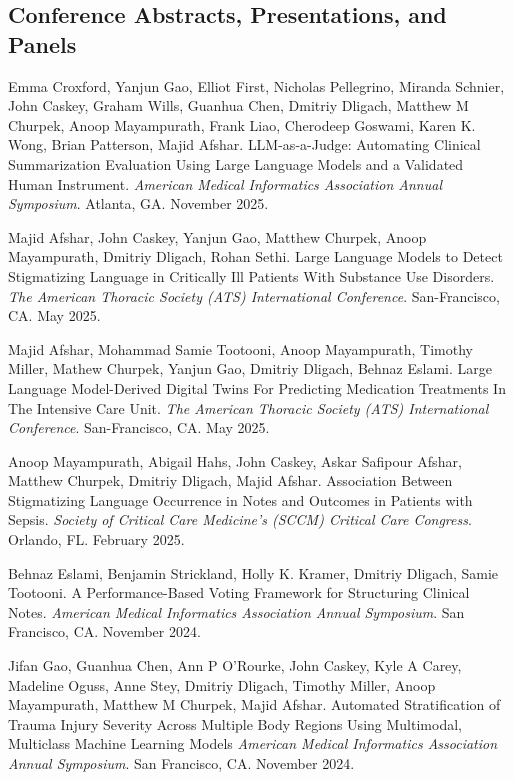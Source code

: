 \documentclass[letterpaper]{article}
\renewenvironment{itemize}{
  \begin{list}{}{
    \setlength{\leftmargin}{1.5em}
  }
}{
  \end{list}
}
\begin{document}
\subsection*{Conference Abstracts, Presentations, and Panels}
\begin{itemize}
\item Emma Croxford, Yanjun Gao, Elliot First, Nicholas Pellegrino, Miranda Schnier, John Caskey, Graham Wills, Guanhua Chen, Dmitriy Dligach, Matthew M Churpek, Anoop Mayampurath, Frank Liao, Cherodeep Goswami, Karen K. Wong, Brian Patterson, Majid Afshar. LLM-as-a-Judge: Automating Clinical Summarization Evaluation Using Large Language Models and a Validated Human Instrument. \emph{American Medical Informatics Association Annual Symposium}. Atlanta, GA. November 2025.
\item Majid Afshar, John Caskey, Yanjun Gao, Matthew Churpek, Anoop Mayampurath, Dmitriy Dligach, Rohan Sethi. Large Language Models to Detect Stigmatizing Language in Critically Ill Patients With Substance Use Disorders. \emph{The American Thoracic Society (ATS) International Conference}. San-Francisco, CA. May 2025.
\item Majid Afshar, Mohammad Samie Tootooni, Anoop Mayampurath, Timothy Miller, Mathew Churpek, Yanjun Gao, Dmitriy Dligach, Behnaz Eslami. Large Language Model-Derived Digital Twins For Predicting Medication Treatments In The Intensive Care Unit. \emph{The American Thoracic Society (ATS) International Conference}. San-Francisco, CA. May 2025.
\item Anoop Mayampurath, Abigail Hahs, John Caskey, Askar Safipour Afshar, Matthew Churpek, Dmitriy Dligach, Majid Afshar. Association Between Stigmatizing Language Occurrence in Notes and Outcomes in Patients with Sepsis. \emph{Society of Critical Care Medicine's (SCCM) Critical Care Congress}. Orlando, FL. February 2025.
\item Behnaz Eslami, Benjamin Strickland, Holly K. Kramer, Dmitriy Dligach, Samie Tootooni. A Performance-Based Voting Framework for Structuring Clinical Notes. \emph{American Medical Informatics Association Annual Symposium}. San Francisco, CA. November 2024.
\item Jifan Gao, Guanhua Chen, Ann P O’Rourke, John Caskey, Kyle A Carey, Madeline Oguss, Anne Stey, Dmitriy Dligach, Timothy Miller, Anoop Mayampurath, Matthew M Churpek, Majid Afshar. Automated Stratification of Trauma Injury Severity Across Multiple Body Regions Using Multimodal, Multiclass Machine Learning Models \emph{American Medical Informatics Association Annual Symposium}. San Francisco, CA. November 2024.

\end{itemize}
\end{document}
